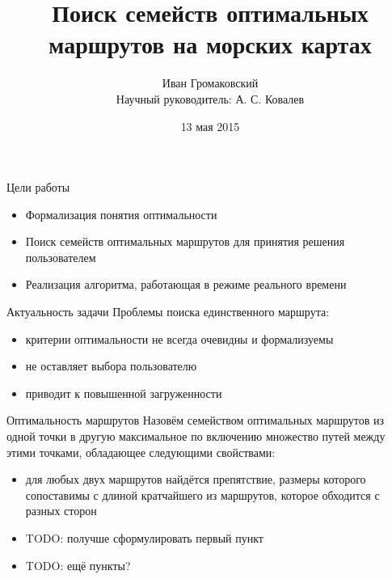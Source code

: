 \documentclass[mathserif]{beamer}
\title{Поиск семейств оптимальных маршрутов на морских картах}
\author{Иван Громаковский \\
Научный руководитель: А. С. Ковалев}
\institute{Санкт-Петербургский национальный исследовательский университет \\ информационных технологий, механики и оптики}
\date{13 мая 2015}
\begin{document}
\frame{\titlepage}

\begin{frame}{Цели работы}
    \begin{itemize}[<+->]
        \item Формализация понятия оптимальности
        \item Поиск семейств оптимальных маршрутов для принятия
          решения пользователем
        \item Реализация алгоритма, работающая в режиме реального времени
    \end{itemize}
\end{frame}

\begin{frame}{Актуальность задачи}
    Проблемы поиска единственного маршрута:
    \begin{itemize}[<+->]
        \item критерии оптимальности не всегда очевидны и формализуемы
        \item не оставляет выбора пользователю
        \item приводит к повышенной загруженности
    \end{itemize}
\end{frame}
        
\begin{frame}{Оптимальность маршрутов}
    Назовём семейством оптимальных маршрутов из одной точки в другую 
    максимальное по включению множество путей между этими точками,
    обладающее следующими свойствами:
    \begin{itemize}[<+->]
        \item для любых двух маршрутов найдётся препятствие, размеры
          которого сопоставимы с длиной кратчайшего из маршрутов,
          которое обходится с разных сторон
        \item TODO: получше сформулировать первый пункт
        \item TODO: ещё пункты?
    \end{itemize}
\end{frame}
\end{document}
